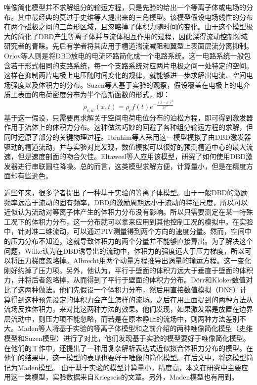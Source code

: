 唯像简化模型并不求解组分的输运方程，只是先验的给出一个等离子体或电场的分布。其中最经典的莫过于史维等人提出来的三角模型\cite{shyy2002}。该模型假设电场线性的分布在两个磁极之间的三角形区域，且忽略掉了体积力随时间的变化。由于这个模型极大的简化了DBD产生等离子体并与流体相互作用的过程，因此深得流动控制领域研究者的青睐。先后有学者将其应用于槽道湍流减阻\cite{LiZX2015}和翼型上表面层流分离抑制\cite{Rizzetta2011}。Orlov等人\cite{Orlov2006,Corke2008,Mertz2011}则是将DBD放电的电流环路简化成一个电路系统。这一电路系统一般包含若干形式相同的支路系统，每一个支路系统对应两片电极之间一处特定的空间。这样在抑制两片电极上电压随时间变化的规律，就能够进一步求解出电流、空间电场强度以及体积力的分布。Suzen等人\cite{suzen2005,suzen2007}基于实验\cite{Enloe2004,enloe2006}的观察，假设覆盖在电极上的电介质上表面的电荷密度分布为半个高斯函数的形式，即：
\begin{equation}\label{e:suzen}
  \rho_{c,w}(x,t)=\rho_cf(t)e^{-\frac{(x-\mu)^2}{2\sigma^2}}
\end{equation}
基于这一假设，只需要再求解关于空间电荷电位分布的泊松方程，即可得到激发器作用于流体上的体积力分布。这种做法巧妙的回避了各种组分输运方程的求解，但同时还原了部分的关键物理过程。Ibrahim等人\cite{Ibrahim2014}采用这一模型模拟了由DBD激发器驱动的槽道流动，并与实验\cite{Debiasi2011}对比发现，数值模拟可以很好的预测槽道中心的最大流速，但是速度剖面的吻合欠佳。Eltaweel等人\cite{Eltaweel2014}应用该模型，研究了如何使用DBD激发器进行串联圆柱降噪。总的而言，这类模型求解方便，计算量小，但是在精度方面却有些逊色。

近些年来，很多学者提出了一种基于实验的等离子体模型\cite{albrecht2011method,Kotsonis2011,kriegseis2013velocity,Benard2014,wilke2009aerodynamische}。由于一般DBD的激励频率远高于流动的固有频率，DBD的激励周期远小于流动的特征尺度，所以可以近似认为流动对等离子体产生的体积力分布没有影响。所以只需要测定在某一特殊工况下的体积力分布，这一分布就可以拿来应用到其他控制工况的模拟中。在实验中，针对准二维流动，可以通过PIV测量得到两个方向的速度分量。然而，空间中的压力分布不知道，这就导致体积力的两个分量并不能够直接算出。为了解决这个问题，Wilke\cite{wilke2009aerodynamische}认为在DBD诱导出的流动中，体积力的强度远大于压力梯度，所以可以将压力梯度忽略掉。Albrecht\cite{albrecht2011method}用两个动量方程推导出涡量的输运方程。这一变化刚好约掉了压力项。另外，他认为，平行于壁面的体积力远大于垂直于壁面的体积力，并将后者忽略掉，从而得到了平行于壁面的体积力分布。D\"orr和Kloker\cite{dorr2015numerical}数值对比了这两种做法。他们先假设一个体积力分布，然后用直接数值模拟（DNS）计算得到这种预先设定的体积力会产生怎样的流场。之后在用上面提到的两种方法从流场反推体积力，来对比这两种方法的效果。他们发现，如果激发器是放置在边界层流动中，则压力项不能忽略，而若是在原本静止的流场中，则两种方法差别不大。Maden等人\cite{Maden2013}将基于实验的等离子体模型和之前介绍的两种唯像简化模型（史维模型\cite{shyy2002}和Suzen模型\cite{suzen2007}）进行了对比，他们发现基于实验的模型要好于唯像简化模型。在他们的工作中，还提出了一种用复杂解析表达式近似拟合体积力分布的模型。在他们的结果中，这一模型的表现也要好于唯像的简化模型。在后文中，将这模型简记为Maden模型。 由于基于实验的模型计算量小，精度高，本文在研究中主要应用这一类模型，实验数据来自Kriegseis\cite{kriegseis2013velocity}的文章。另外，Maden模型也有用到。

